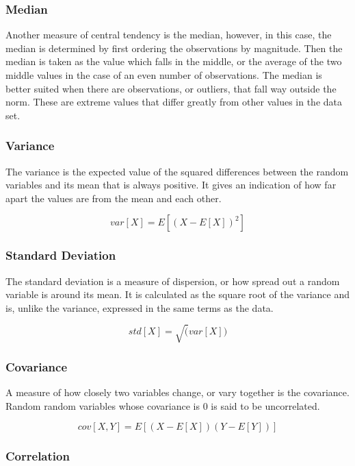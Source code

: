\documentclass[12pt,]{article}
\begin{document}
\subsubsection{Median}\label{median}

Another measure of central tendency is the median, however, in this
case, the median is determined by first ordering the observations by
magnitude. Then the median is taken as the value which falls in the
middle, or the average of the two middle values in the case of an even
number of observations. The median is better suited when there are
observations, or outliers, that fall way outside the norm. These are
extreme values that differ greatly from other values in the data set.

\subsubsection{Variance}\label{variance}

The variance is the expected value of the squared differences between
the random variables and its mean that is always positive. It gives an
indication of how far apart the values are from the mean and each other.

\[ var[X] = E[(X - E[X])^2] \]

\subsubsection{Standard Deviation}\label{standard-deviation}

The standard deviation is a measure of dispersion, or how spread out a
random variable is around its mean. It is calculated as the square root
of the variance and is, unlike the variance, expressed in the same terms
as the data.

\[ std[X] = \sqrt(var[X]) \]

\subsubsection{Covariance}\label{covariance}

A measure of how closely two variables change, or vary together is the
covariance. Random random variables whose covariance is 0 is said to be
uncorrelated.

\[ cov[X,Y] = E[(X - E[X])(Y-E[Y])] \]

\subsubsection{Correlation}\label{correlation}
\end{document}

